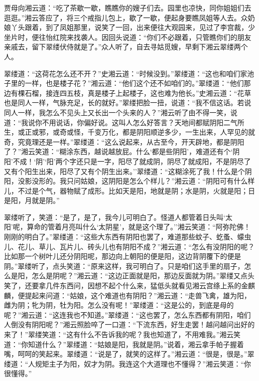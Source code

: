 贾母向湘云道：``吃了茶歇一歇，瞧瞧你的嫂子们去。园里也凉快，同你姐姐们去逛逛。''湘云答应了，将三个戒指儿包上，歇了一歇，便起身要瞧凤姐等人去。众奶娘丫头跟着，到了凤姐那里，说笑了一回，出来便往大观园来，见过了李宫裁，少坐片时，便往怡红院来找袭人。因回头说道：``你们不必跟着，只管瞧你们的朋友亲戚去，留下翠缕伏侍就是了。''众人听了，自去寻姑觅嫂，早剩下湘云翠缕两个人。

翠缕道：``这荷花怎么还不开？''史湘云道：``时候没到。''翠缕道：``这也和咱们家池子里的一样，也是楼子花？''湘云道：``他们这个还不如咱们的。''翠缕道：``他们那边有棵石榴，接连四五枝，真是楼子上起楼子，这也难为他长。''史湘云道：``花草也是同人一样，气脉充足，长的就好。''翠缕把脸一扭，说道：``我不信这话。若说同人一样，我怎么不见头上又长出一个头来的人？''湘云听了由不得一笑，说道：``我说你不用说话，你偏好说。这叫人怎么好答言？天地间都赋阴阳二气所生，或正或邪，或奇或怪，千变万化，都是阴阳顺逆多少，一生出来，人罕见的就奇，究竟理还是一样。''翠缕道：``这么说起来，从古至今，开天辟地，都是阴阳了？''湘云笑道：``糊涂东西，越说越放屁。什么`都是些阴阳'，难道还有个`阴阳'不成！`阴'`阳'两个字还只是一字，阳尽了就成阴，阴尽了就成阳，不是阴尽了又有个阳生出来，阳尽了又有个阴生出来。''翠缕道：``这糊涂死了我！什么是个阴阳，没影没形的。我只问姑娘，这阴阳是怎么个样儿？''湘云道：``阴阳可有什么样儿，不过是个气，器物赋了成形。比如天是阳，地就是阴；水是阴，火就是阳；日是阳，月就是阴。''

翠缕听了，笑道：``是了，是了，我今儿可明白了。怪道人都管着日头叫`太阳'呢，算命的管着月亮叫什么`太阴星'，就是这个理了。''湘云笑道：``阿弥陀佛！刚刚的明白了。''翠缕道：``这些大东西有阴阳也罢了，难道那些蚊子、虼蚤、蠓虫儿、花儿、草儿、瓦片儿、砖头儿也有阴阳不成？''湘云道：``怎么有没阴阳的呢？比如那一个树叶儿还分阴阳呢，那边向上朝阳的便是阳，这边背阴覆下的便是阴。''翠缕听了，点头笑道：``原来这样，我可明白了。只是咱们这手里的扇子，怎么是阳，怎么是阴呢？''湘云道：``这边正面就是阳，那边反面就为阴。''翠缕又点头笑了，还要拿几件东西问，因想不起个什么来，猛低头就看见湘云宫绦上系的金麒麟，便提起来问道：``姑娘，这个难道也有阴阳？''湘云道：``走兽飞禽，雄为阳，雌为阴；牝为阴，牡为阳。怎么没有呢！''翠缕道：``这是公的，到底是母的呢？''湘云道：``这连我也不知道。''翠缕道：``这也罢了，怎么东西都有阴阳，咱们人倒没有阴阳呢？''湘云照脸啐了一口道：``下流东西，好生走罢！越问越问出好的来了！''翠缕笑道：``这有什么不告诉我的呢？我也知道了，不用难我。''湘云笑道：``你知道什么？''翠缕道：``姑娘是阳，我就是阴。''说着，湘云拿手帕子握着嘴，呵呵的笑起来。翠缕道：``说是了，就笑的这样了。''湘云道：``很是，很是。''翠缕道：``人规矩主子为阳，奴才为阴。我连这个大道理也不懂得？''湘云笑道：``你很懂得。''


